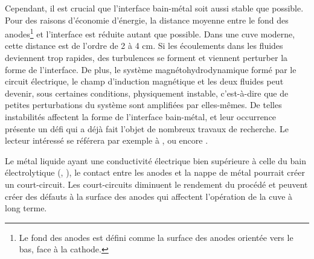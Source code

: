 Cependant, il est crucial que l'interface bain-métal soit aussi stable
que possible. Pour des raisons d'économie d'énergie, la distance
moyenne entre le fond des anodes\footnote{Le fond des anodes est
  défini comme la surface des anodes orientée vers
  le bas, face à la cathode.} et l'interface est réduite
autant que possible. Dans une cuve moderne, cette distance est de
l'ordre de \num{2} à \num{4} \si{\centi\meter}. Si les écoulements
dans les fluides deviennent trop rapides, des turbulences se forment
et viennent perturber la forme de l'interface. De plus, le système
magnétohydrodynamique formé par le circuit électrique, le champ
d'induction magnétique et les deux fluides peut devenir, sous
certaines conditions, physiquement instable, c'est-à-dire que de
petites perturbations du système sont amplifiées par elles-mêmes. De
telles instabilités affectent la forme de l'interface bain-métal, et
leur occurrence présente un défi qui a déjà fait l'objet de nombreux
travaux de recherche. Le lecteur intéressé se référera par exemple à
\cite{Descloux1998}, \cite{Sneyd1985} ou encore \cite{Maillard1996}.

Le métal liquide ayant une conductivité électrique bien supérieure à
celle du bain électrolytique (\cite{Wang1992}, \cite{Apfelbaum2003}),
le contact entre les anodes et la nappe de métal pourrait créer un
court-circuit. Les court-circuits diminuent le rendement du procédé et
peuvent créer des défauts à la surface des anodes qui affectent
l'opération de la cuve à long terme.


